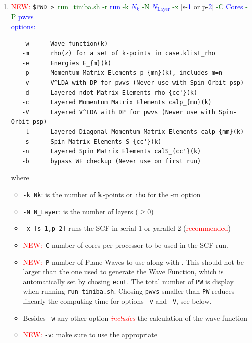 \documentclass[12pt]{article}
\numberwithin{equation}{section}
\begin{document}
\begin{enumerate}
\newpage
\item  \textcolor{red}{NEW:}
 \verb=$PWD > =\textcolor{darkgreen}{run\_tiniba.sh}
\textcolor{darkgreen}{-r} \textcolor{blue}{run} 
\textcolor{darkgreen}{-k} \textcolor{blue}{$N_k$} 
\textcolor{darkgreen}{-N} \textcolor{blue}{$N_{\mathrm{Layer}}$} 
\textcolor{darkgreen}{-x} [s-\textcolor{blue}{1} or
p-\textcolor{blue}{2}] 
\textcolor{darkgreen}{-C} \textcolor{blue}{Cores}
\textcolor{darkgreen}{-P} \textcolor{blue}{pwvs}\\
\textcolor{blue}{options:}  
\begin{verbatim}
   -w      Wave function(k)
   -m      rho(z) for a set of k-points in case.klist_rho
   -e      Energies E_{m}(k)
   -p      Momentum Matrix Elements p_{mn}(k), includes m=n
   -v      V^LDA with DP for pwvs (Never use with Spin-Orbit psp)
   -d      Layered ndot Matrix Elements rho_{cc'}(k) 
   -c      Layered Momentum Matrix Elements calp_{mn}(k)
   -V      Layered V^LDA with DP for pwvs (Never use with Spin-Orbit psp)
   -l      Layered Diagonal Momentum Matrix Elements calp_{mm}(k)
   -s      Spin Matrix Elements S_{cc'}(k)
   -n      Layered Spin Matrix Elements calS_{cc'}(k)
   -b      bypass WF checkup (Never use on first run)
\end{verbatim}
where
\begin{itemize}
\item \verb=-k Nk=: is the number of $\mathbf{k}$-points or \verb=rho= for
the  -m option
\item \verb=-N N_Layer=: is the number of
layers ($\geq 0$) %
\item \verb=-x [s-1,p-2]= runs the SCF in {\it s}erial-1 or {\it p}arallel-2 
(\textcolor{red}{recommended})
\item \textcolor{red}{NEW:}\verb=-C= number of cores per processor to be used in the SCF run. 
\item \textcolor{red}{NEW:}\verb=-P= number of Plane Waves to use
  along with \depe. This should not be larger than the one used to
  generate the Wave Function, which is automatically set by chosing
  \verb=ecut=. The total number of \verb=PW= is display when running
  \verb=run_tiniba.sh=.
Chosing \verb=pwvs= smaller than \verb=PW= reduces linearly the
computing time for options \verb=-v= and \verb=-V=, see below.
\item Besides \verb=-w= 
any other option \textcolor{red}{{\it includes}} the
   calculation of the wave function
\item \textcolor{red}{NEW:}
\verb=-v=: make sure to use the appropriate 

\end{itemize}
\end{enumerate}
\end{document}

